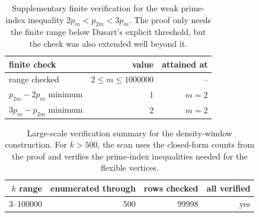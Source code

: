 \documentclass[11pt]{article}
\theoremstyle{plain}
\theoremstyle{definition}
\theoremstyle{remark}
\begin{document}
\begin{table}[htbp]
\centering
\caption{Supplementary finite verification for the weak prime-index inequality
$2p_m<p_{2m}<3p_m$.  The proof only needs the finite range below Dusart's
explicit threshold, but the check was also extended well beyond it.}
\label{tab:prime-index-check}
\small
\begin{tabular}{@{}lrr@{}}
\toprule
finite check & value & attained at \\
\midrule
range checked & $2\le m\le 1000000$ & -- \\
$p_{2m}-2p_m$ minimum & 1 & $m=2$ \\
$3p_m-p_{2m}$ minimum & 2 & $m=2$ \\
\bottomrule
\end{tabular}

\end{table}

\begin{table}[htbp]
\centering
\caption{Large-scale verification summary for the density-window construction.
For $k>500$, the scan uses the closed-form counts from the proof and verifies
the prime-index inequalities needed for the flexible vertices.}
\label{tab:density-window-summary}
\small
\begin{tabular}{@{}rrrr@{}}
\toprule
$k$ range & enumerated through & rows checked & all verified \\
\midrule
3--100000 & 500 & 99998 & yes \\
\bottomrule
\end{tabular}

\end{table}
\end{document}
